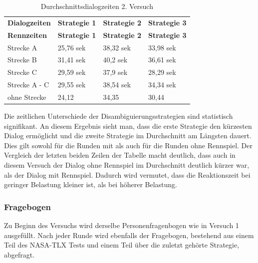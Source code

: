 \documentclass[12pt,a4paper]{scrartcl}
\begin{document}
\begin{longtable}{p{3cm}p{3cm}p{3cm}p{3cm} }
	\label{Durchschnittsdialogzeiten2}\\
	\caption[Durchschnittsdialogzeiten 2. Versuch]{Durchschnittsdialogzeiten 2. Versuch}\\
	\hline
	\textbf{Dialogzeiten}&\textbf{Strategie 1}&\textbf{Strategie 2} &\textbf{Strategie 3}\\
	\hline
	\endfirsthead
	\hline
	\textbf{Rennzeiten}&\textbf{Strategie 1}&\textbf{Strategie 2} &\textbf{Strategie 3}\\
	\hline
	\endhead
Strecke A & 25,76 sek & 38,32 sek & 33,98 sek \\
Strecke B & 31,41 sek & 40,2 sek & 36,61 sek \\
Strecke C  & 29,59 sek & 37,9 sek & 28,29 sek \\
\hline
\hline
Strecke A - C & 29,55 sek & 38,54 sek & 34,34 sek\\
\hline
ohne Strecke & 24,12 & 34,35 & 30,44 \\
\hline
\end{longtable}

Die zeitlichen Unterschiede der Disambiguierungsstrategien sind statistisch signifikant. An diesem Ergebnis sieht man, dass die erste Strategie den kürzesten Dialog ermöglicht und die zweite Strategie im Durchschnitt am Längsten dauert. Dies gilt sowohl für die Runden mit als auch für die Runden ohne Rennspiel. Der Vergleich der letzten beiden Zeilen der Tabelle macht deutlich, dass auch in diesem Versuch der Dialog ohne Rennspiel im Durchschnitt deutlich kürzer war, als der Dialog mit Rennspiel. Dadurch wird vermutet, dass die Reaktionszeit bei geringer Belastung kleiner ist, als bei höherer Belastung.  

\subsubsection{Fragebogen}
\label{fragebogen2}
Zu Beginn des Versuchs wird derselbe Personenfragenbogen wie in Versuch 1 ausgefüllt. Nach jeder Runde wird ebenfalls der Fragebogen, bestehend aus einem Teil des NASA-TLX Tests und einem Teil über die zuletzt gehörte Strategie, abgefragt.
\end{document}
